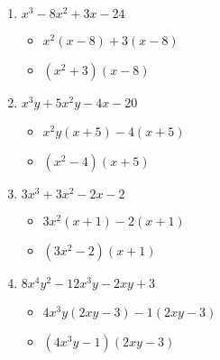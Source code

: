 \documentclass{article}
\begin{document}
\begin{enumerate}
\item $x^{3} - 8x^{2} + 3x - 24$
  \begin{itemize}
  \item $x^{2}(x-8)+3(x-8)$
  \item $(x^{2}+3)(x-8)$
  \end{itemize}
\item $x^{3}y + 5x^{2}y - 4x - 20$
  \begin{itemize}
  \item $x^{2}y(x+5)-4(x+5)$
  \item $(x^{2}-4)(x+5)$
  \end{itemize}
\item $3x^{3} + 3x^{2} - 2x - 2$
  \begin{itemize}
  \item $3x^{2}(x+1)-2(x+1)$
  \item $(3x^{2}-2)(x+1)$
  \end{itemize}
\item $8x^{4}y^{2} - 12x^{3}y - 2xy + 3$
  \begin{itemize}
  \item $4x^{3}y(2xy-3)-1(2xy-3)$
  \item $(4x^{3}y-1)(2xy-3)$
  \end{itemize}
\end{enumerate}

\newpage
\end{document}
